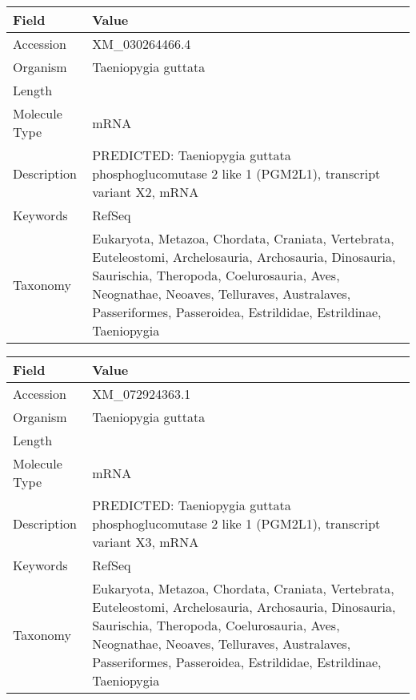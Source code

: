 \documentclass[10pt]{article}
\begin{document}
\vspace{1em}
{\footnotesize
\begin{longtable}{>{\raggedright\arraybackslash}p{4.5cm} >{\raggedright\arraybackslash}p{11.5cm}}
\textbf{Field} & \textbf{Value} \\
\hline
Accession & XM\_030264466.4 \\
Organism & Taeniopygia guttata \\
Length & 5997 \\
Molecule Type & mRNA \\
Description & PREDICTED: Taeniopygia guttata phosphoglucomutase 2 like 1 (PGM2L1), transcript variant X2, mRNA \\
Keywords & RefSeq \\
Taxonomy & Eukaryota, Metazoa, Chordata, Craniata, Vertebrata, Euteleostomi, Archelosauria, Archosauria, Dinosauria, Saurischia, Theropoda, Coelurosauria, Aves, Neognathae, Neoaves, Telluraves, Australaves, Passeriformes, Passeroidea, Estrildidae, Estrildinae, Taeniopygia \\
\end{longtable}
}

\vspace{1em}
{\footnotesize
\begin{longtable}{>{\raggedright\arraybackslash}p{4.5cm} >{\raggedright\arraybackslash}p{11.5cm}}
\textbf{Field} & \textbf{Value} \\
\hline
Accession & XM\_072924363.1 \\
Organism & Taeniopygia guttata \\
Length & 5809 \\
Molecule Type & mRNA \\
Description & PREDICTED: Taeniopygia guttata phosphoglucomutase 2 like 1 (PGM2L1), transcript variant X3, mRNA \\
Keywords & RefSeq \\
Taxonomy & Eukaryota, Metazoa, Chordata, Craniata, Vertebrata, Euteleostomi, Archelosauria, Archosauria, Dinosauria, Saurischia, Theropoda, Coelurosauria, Aves, Neognathae, Neoaves, Telluraves, Australaves, Passeriformes, Passeroidea, Estrildidae, Estrildinae, Taeniopygia \\
\end{longtable}
}
\end{document}
